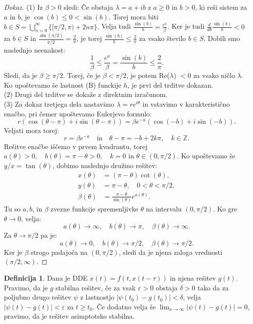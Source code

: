 \documentclass[12pt,a4paper]{amsart}
\theoremstyle{definition} %
\newtheorem{definicija}{Definicija}[section]
\theoremstyle{plain} %
\newcommand{\Z}{\mathbb Z}
\begin{document}
\begin{proof}[Dokaz]
(1)  Iz $\beta > 0$ sledi: Če obstaja $\lambda = a +ib$ z $a \geq 0$ in $b > 0$, ki reši sistem za $a$ in $b$,
je $\cos(b) \leq 0 < \sin(b)$. Torej mora biti $b \in S = \bigcup_{n=0}^{\infty}\{[\pi / 2,\pi)+2n\pi\}.$ Velja
tudi $\frac{\sin(b)}{b}=\frac{e^{a}}{\beta}$. Ker je tudi $\frac{d}{db}\frac{\sin(b)}{b} < 0$ za $b \in S$
in $\frac{\sin(\pi /2)}{\pi / 2} = \frac{2}{\pi}$, je torej $\frac{\sin(b)}{b} \leq \frac{2}{\pi}$
za vsako število $b \in S$.
Dobili smo naslednjo neenakost: 
\[\frac{1}{\beta} \leq \frac{e^a}{\beta} = \frac{\sin(b)}{b} \leq \frac{2}{\pi}.\]
Sledi, da je $\beta \geq \pi/2$. Torej, če je $\beta < \pi/2$, je potem Re($\lambda$) $<0$ za vsako ničlo
$\lambda$. Ko upoštevamo še lastnost (B) funckije $h$, je prvi del trditve dokazan. \\
(2)  Drugi del trditve se dokaže z direktnim izračunom. \\
(3)  Za dokaz tretjega dela nastavimo $\lambda = re^{i\theta}$ in vstavimo v karakteristično enačbo, pri čemer
upoštevamo Eulerjevo formulo:
\[ r(\cos(\theta - \pi)+i\sin(\theta - \pi))=\beta e^{-a}(\cos(-b)+i\sin(-b)).\]
Veljati mora torej:
\[r=\beta e^{-a} \quad \text{in} \quad \theta - \pi = -b + 2k\pi, \quad k \in \Z.\]
Rešitve enačbe iščemo v prvem kvadrantu, torej $a(\theta)>0,\quad b(\theta) = \pi - \theta > 0, \quad
k=0$ in $\theta \in (0,\pi/2)$. Ko upoštevamo še $y/x = \tan(\theta)$, dobimo naslednjo družino rešitev:
\begin{equation*}
    \begin{split}
        x(\theta) &= (\pi - \theta)\cot(\theta), \\
        y(\theta) &= \pi - \theta, \quad 0<\theta <\pi/2, \\
        \beta(\theta) &= \frac{\pi - \theta}{\sin(\theta)}e^{a(\theta)}. 
    \end{split}      
\end{equation*}
Tu so $a, b$, in $\beta$ zvezne funkcije spremenljivke $\theta$ na intervalu $(0,\pi/2)$. Ko gre $\theta \to 0$,
velja:
\[ a(\theta) \to \infty, \quad b(\theta) \to \pi, \quad \beta(\theta) \to \infty.\]
Za $\theta \to \pi/2$ pa je:
\[a(\theta) \to 0, \quad b(\theta) \to \pi/2, \quad \beta(\theta) \to \pi/2.\]
Ker je $\beta$ strogo padajoča na $(0,\pi/2)$, sledi da je njena zaloga vrednosti $(\pi/2, \infty)$.
\end{proof}

\begin{definicija}
    Dana je DDE $\dot{x}(t)=f(t,x(t-\tau))$ in njena rešitev $g(t)$.
    Pravimo, da je $g$ stabilna rešitev, če 
    za vsak $\varepsilon > 0$ obstaja $\delta > 0$ tako da za poljubno drugo rešitev $\psi$ z lastnostjo
    $|\psi(t_0)-g(t_0)| < \delta$, velja $|\psi(t)-g(t)| < \varepsilon$ za $t \geq t_0$.
    Če dodatno velja
    še $\lim_{x \to \infty}|\psi(t)-g(t)|=0$, pravimo, da je rešitev asimptotsko stabilna.
\end{definicija}
\end{document}
